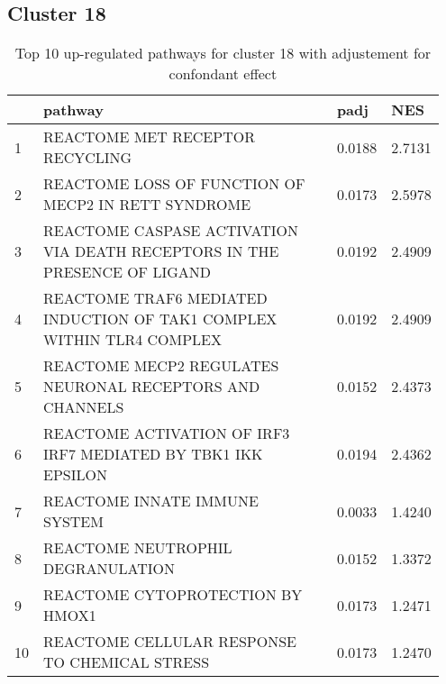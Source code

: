 \documentclass{article}
\begin{document}
\subsection{Cluster 18 }
\begin{table}[H]
\centering
\begin{tabular}{p{0.05\linewidth}p{0.7\linewidth}p{0.1\linewidth}p{0.1\linewidth}}
  \hline
 & pathway & padj & NES \\ 
  \hline
1 & REACTOME MET RECEPTOR RECYCLING & 0.0188 & 2.7131 \\ 
  2 & REACTOME LOSS OF FUNCTION OF MECP2 IN RETT SYNDROME & 0.0173 & 2.5978 \\ 
  3 & REACTOME CASPASE ACTIVATION VIA DEATH RECEPTORS IN THE PRESENCE OF LIGAND & 0.0192 & 2.4909 \\ 
  4 & REACTOME TRAF6 MEDIATED INDUCTION OF TAK1 COMPLEX WITHIN TLR4 COMPLEX & 0.0192 & 2.4909 \\ 
  5 & REACTOME MECP2 REGULATES NEURONAL RECEPTORS AND CHANNELS & 0.0152 & 2.4373 \\ 
  6 & REACTOME ACTIVATION OF IRF3 IRF7 MEDIATED BY TBK1 IKK EPSILON & 0.0194 & 2.4362 \\ 
  7 & REACTOME INNATE IMMUNE SYSTEM & 0.0033 & 1.4240 \\ 
  8 & REACTOME NEUTROPHIL DEGRANULATION & 0.0152 & 1.3372 \\ 
  9 & REACTOME CYTOPROTECTION BY HMOX1 & 0.0173 & 1.2471 \\ 
  10 & REACTOME CELLULAR RESPONSE TO CHEMICAL STRESS & 0.0173 & 1.2470 \\ 
   \hline
\end{tabular}
\caption{Top 10 up-regulated pathways for cluster 18 with adjustement for confondant effect} 
\label{tab:q3_2_conf_18}
\end{table}
\end{document}
